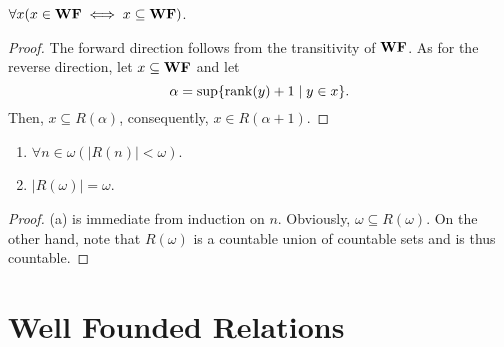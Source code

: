 
\begin{lemma}
    $\forall x(x\in\mathbf{WF}\iff x\subseteq\mathbf{WF})$.
\end{lemma}
\begin{proof}
    The forward direction follows from the transitivity of $\mathbf{WF}$. As for the reverse direction, let $x\subseteq\mathbf{WF}$ and let 
    \begin{equation*}
        \alpha = \sup\{\operatorname{rank}(y) + 1\mid y\in x\}.
    \end{equation*}
    Then, $x\subseteq R(\alpha)$, consequently, $x\in R(\alpha + 1)$.
\end{proof}

\begin{lemma}
    \begin{enumerate}[label=(\alph*)]
        \item $\forall n\in\omega(|R(n)| < \omega)$.
        \item $|R(\omega)| = \omega$.
    \end{enumerate}
\end{lemma}
\begin{proof}
    (a) is immediate from induction on $n$. Obviously, $\omega\subseteq R(\omega)$. On the other hand, note that $R(\omega)$ is a countable union of countable sets and is thus countable.
\end{proof}

\section{Well Founded Relations}